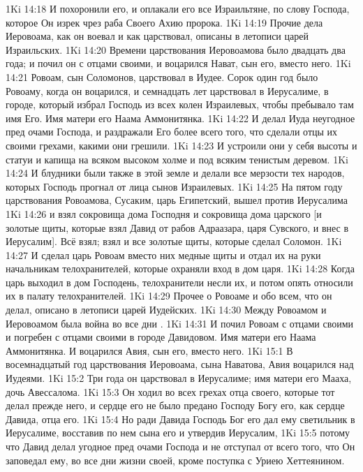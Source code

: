 \vs 1Ki 14:18 И похоронили его, и оплакали его все Израильтяне, по слову Господа, которое Он изрек чрез раба Своего Ахию пророка.
\rsbpar\vs 1Ki 14:19 Прочие дела Иеровоама, как он воевал и как царствовал, описаны в летописи царей Израильских.
\vs 1Ki 14:20 Времени царствования Иеровоамова было двадцать два года; и почил он с отцами своими, и воцарился Нават, сын его, вместо него.
\rsbpar\vs 1Ki 14:21 Ровоам, сын Соломонов, царствовал в Иудее. Сорок один год было Ровоаму, когда он воцарился, и семнадцать лет царствовал в Иерусалиме, в городе, который избрал Господь из всех колен Израилевых, чтобы пребывало там имя Его. Имя матери его Наама Аммонитянка.
\vs 1Ki 14:22 И делал Иуда неугодное пред очами Господа, и раздражали Его более всего того, что сделали отцы их своими грехами, какими они грешили.
\vs 1Ki 14:23 И устроили они у себя высоты и статуи и капища на всяком высоком холме и под всяким тенистым деревом.
\vs 1Ki 14:24 И блудники были также в этой земле и делали все мерзости тех народов, которых Господь прогнал от лица сынов Израилевых.
\vs 1Ki 14:25 На пятом году царствования Ровоамова, Сусаким, царь Египетский, вышел против Иерусалима
\vs 1Ki 14:26 и взял сокровища дома Господня и сокровища дома царского [и золотые щиты, которые взял Давид от рабов Адраазара, царя Сувского, и внес в Иерусалим]. Всё взял; взял и все золотые щиты, которые сделал Соломон.
\vs 1Ki 14:27 И сделал царь Ровоам вместо них медные щиты и отдал их на руки начальникам телохранителей, которые охраняли вход в дом царя.
\vs 1Ki 14:28 Когда царь выходил в дом Господень, телохранители несли их, и потом опять относили их в палату телохранителей.
\vs 1Ki 14:29 Прочее о Ровоаме и обо всем, что он делал, описано в летописи царей Иудейских.
\vs 1Ki 14:30 Между Ровоамом и Иеровоамом была война во все дни .
\vs 1Ki 14:31 И почил Ровоам с отцами своими и погребен с отцами своими в городе Давидовом. Имя матери его Наама Аммонитянка. И воцарился Авия, сын его, вместо него.
\vs 1Ki 15:1 В восемнадцатый год царствования Иеровоама, сына Наватова, Авия воцарился над Иудеями.
\vs 1Ki 15:2 Три года он царствовал в Иерусалиме; имя матери его Мааха, дочь Авессалома.
\vs 1Ki 15:3 Он ходил во всех грехах отца своего, которые тот делал прежде него, и сердце его не было предано Господу Богу его, как сердце Давида, отца его.
\vs 1Ki 15:4 Но ради Давида Господь Бог его дал ему светильник в Иерусалиме, восставив по нем сына его и утвердив Иерусалим,
\vs 1Ki 15:5 потому что Давид делал угодное пред очами Господа и не отступал от всего того, что Он заповедал ему, во все дни жизни своей, кроме поступка с Уриею Хеттеянином.

